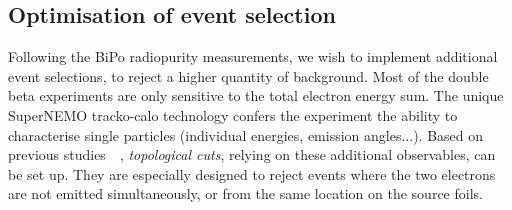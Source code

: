 \subsection{Optimisation of event selection}
\label{subsec:opti_ev_selection}

Following the BiPo radiopurity measurements, we wish to implement additional event selections, to reject a higher quantity of background.
Most of the double beta experiments are only sensitive to the total electron energy sum.
The unique SuperNEMO tracko-calo technology confers the experiment the ability to characterise single particles (individual energies, emission angles...).
Based on previous studies~\cite{CalvezThesis}~\cite{ChaponThesis}, \emph{topological cuts}, relying on these additional observables, can be set up.
They are especially designed to reject events where the two electrons are not emitted simultaneously, or from the same location on the source foils.

